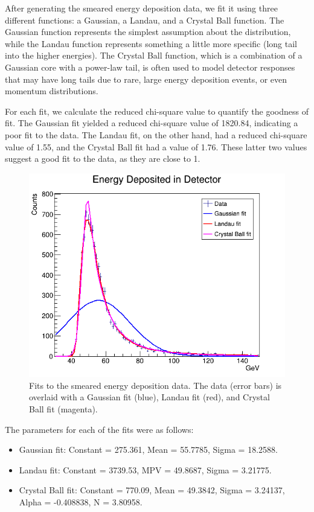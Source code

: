 \documentclass{article}
\begin{document}
After generating the smeared energy deposition data, we fit it using three different functions: a Gaussian, a Landau, and a Crystal Ball function. The Gaussian function represents the simplest assumption about the distribution, while the Landau function represents something a little more specific (long tail into the higher energies). The Crystal Ball function, which is a combination of a Gaussian core with a power-law tail, is often used to model detector responses that may have long tails due to rare, large energy deposition events, or even momentum distributions.

For each fit, we calculate the reduced chi-square value to quantify the goodness of fit. The Gaussian fit yielded a reduced chi-square value of 1820.84, indicating a poor fit to the data. The Landau fit, on the other hand, had a reduced chi-square value of 1.55, and the Crystal Ball fit had a value of 1.76. These latter two values suggest a good fit to the data, as they are close to 1.

\begin{figure}[h!]
    \centering
    \includegraphics[width=\textwidth]{fit.png}
    \caption{Fits to the smeared energy deposition data. The data (error bars) is overlaid with a Gaussian fit (blue), Landau fit (red), and Crystal Ball fit (magenta).}
    \label{fig:fit}
    \end{figure}
    \vspace{1.5cm}

The parameters for each of the fits were as follows:

\begin{itemize}
    \item Gaussian fit: Constant = 275.361, Mean = 55.7785, Sigma = 18.2588.
    \item Landau fit: Constant = 3739.53, MPV = 49.8687, Sigma = 3.21775.
    \item Crystal Ball fit: Constant = 770.09, Mean = 49.3842, Sigma = 3.24137, Alpha = -0.408838, N = 3.80958.
\end{itemize}
\end{document}
